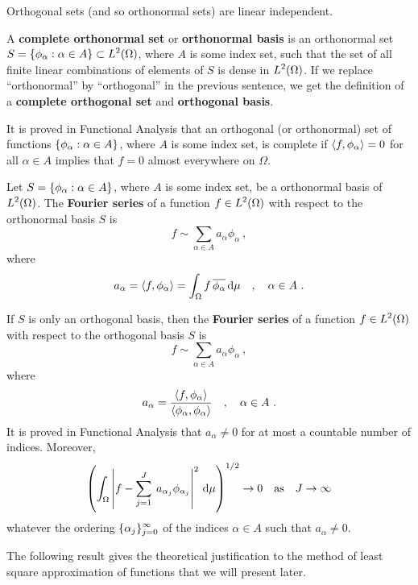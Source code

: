 Orthogonal sets (and so orthonormal sets) are linear independent.

\begin{defn}
A {\bfseries complete orthonormal set} or
{\bfseries orthonormal basis} is an 
orthonormal set
$\displaystyle S= \{ \phi_\alpha : \alpha \in A \} \subset L^2(\Omega)$,
where $A$ is some index set, such that the set of all finite linear
combinations of elements of $S$ is dense in $\displaystyle L^2(\Omega)$.
If we replace ``orthonormal'' by ``orthogonal'' in the previous sentence,
we get the definition of a
{\bfseries complete orthogonal set}
and
{\bfseries orthogonal basis}.
\end{defn}

It is proved in Functional Analysis that an orthogonal (or orthonormal) set
of functions $\displaystyle \{ \phi_\alpha : \alpha \in A\}$, where $A$
is some index set, is complete if $\left\langle{f} , {\phi_\alpha}\right\rangle = 0$
for all $\alpha \in A$ implies that $f = 0$ almost everywhere on
$\Omega$.

\begin{defn}
Let $\displaystyle S= \{ \phi_\alpha : \alpha \in A \}$, where $A$ is some
index set, be a orthonormal basis of $\displaystyle L^2(\Omega)$.  The
{\bfseries Fourier series} of a function
$\displaystyle f \in L^2(\Omega)$ with respect to the orthonormal basis $S$ is
\[
f \sim \sum_{\alpha \in A} a_\alpha \phi_\alpha \ ,
\]
where
\[
a_\alpha = \left\langle{f} , {\phi_\alpha}\right\rangle
= \int_\Omega f\, \overline{\phi_\alpha} \,\mathrm{d}\mu \quad, \quad \alpha \in A \ .
\]
\end{defn}

If $S$ is only an orthogonal basis, then the
{\bfseries Fourier series} of a
function $\displaystyle f \in L^2(\Omega)$ with respect to the
orthogonal basis $S$ is
\[
f \sim \sum_{\alpha \in A} a_\alpha \phi_\alpha \ ,
\]
where
\[
a_\alpha = \frac{\left\langle{f} , {\phi_\alpha}\right\rangle}{\left\langle{\phi_\alpha} , {\phi_\alpha}\right\rangle}
\quad, \quad \alpha \in A \  .
\]
It is proved in Functional Analysis that $a_\alpha \neq 0$ for at most a
countable number of indices.  Moreover,
\[
\left( \int_\Omega
\left|f - \sum_{j=1}^{J} \: a_{\alpha_j} \phi_{\alpha_j} \right|^2
\,\mathrm{d}\mu \right)^{1/2}
\rightarrow 0 \quad \text{as} \quad
J \rightarrow \infty
\]
whatever the ordering $\displaystyle \{ \alpha_j\}_{j=0}^\infty$ of the
indices $\alpha \in A$ such that $a_\alpha \neq 0$.

The following result gives the theoretical justification to the method of
least square approximation of functions that we will present later.


